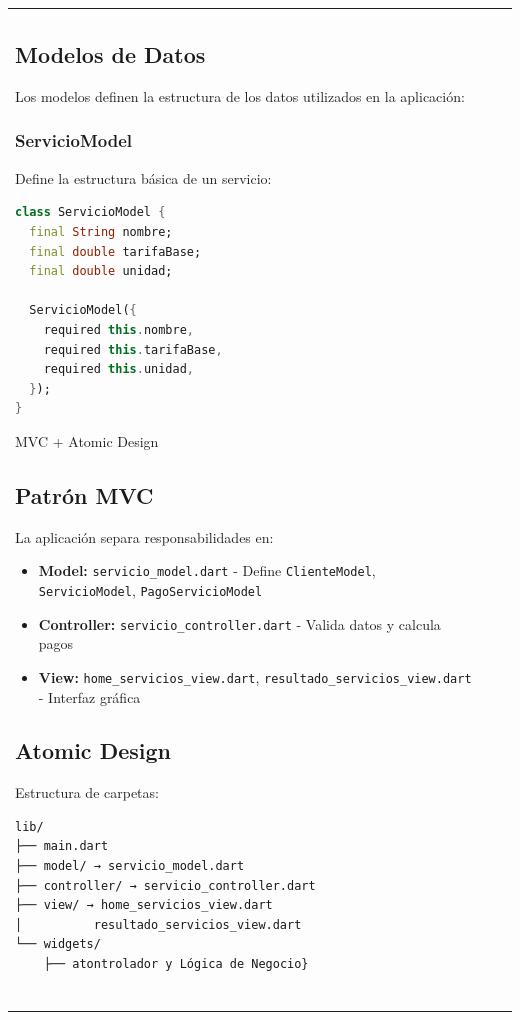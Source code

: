 \documentclass[11pt,a4paper]{article}
\begin{document}
\begin{table}[H]
\begin{tabular}{|l|c|l|}
{\subsection{Modelos de Datos}

Los modelos definen la estructura de los datos utilizados en la aplicación:

\subsubsection{ServicioModel}

Define la estructura básica de un servicio:

\begin{lstlisting}[language=Dart]
class ServicioModel {
  final String nombre;
  final double tarifaBase;
  final double unidad;
  
  ServicioModel({
    required this.nombre,
    required this.tarifaBase,
    required this.unidad,
  });
}
\end{lstlisting}
MVC + Atomic Design}

\subsection{Patrón MVC}

La aplicación separa responsabilidades en:

\begin{itemize}
    \item \textbf{Model:} \texttt{servicio\_model.dart} - Define \texttt{ClienteModel}, \texttt{ServicioModel}, \texttt{PagoServicioModel}
    \item \textbf{Controller:} \texttt{servicio\_controller.dart} - Valida datos y calcula pagos
    \item \textbf{View:} \texttt{home\_servicios\_view.dart}, \texttt{resultado\_servicios\_view.dart} - Interfaz gráfica
\end{itemize}

\subsection{Atomic Design}

Estructura de carpetas:
\begin{lstlisting}[basicstyle=\ttfamily\tiny]
lib/
├── main.dart
├── model/ → servicio_model.dart
├── controller/ → servicio_controller.dart
├── view/ → home_servicios_view.dart
│          resultado_servicios_view.dart
└── widgets/
    ├── atontrolador y Lógica de Negocio}


\end{lstlisting}
\end{tabular}
\end{table}
\end{document}
